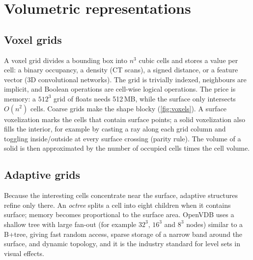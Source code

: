 

\section{Volumetric representations}

\subsection{Voxel grids}

A voxel grid divides a bounding box into $n^3$ cubic cells and stores a value per cell: a binary
occupancy, a density (CT scans), a signed distance, or a feature vector (3D convolutional
networks). The grid is trivially indexed, neighbours are implicit, and Boolean operations are
cell-wise logical operations. The price is memory: a $512^3$ grid of floats needs 512\,MB, while
the surface only intersects $O(n^2)$ cells. Coarse grids make the shape blocky
(\cref{fig:voxels}). A surface voxelization marks the cells that contain surface points; a solid
voxelization also fills the interior, for example by casting a ray along each grid column and
toggling inside/outside at every surface crossing (parity rule). The volume of a solid is then
approximated by the number of occupied cells times the cell volume.


\subsection{Adaptive grids}

Because the interesting cells concentrate near the surface, adaptive structures refine only
there. An \emph{octree} splits a cell into eight children when it contains surface; memory becomes
proportional to the surface area. OpenVDB \citep{Museth2013} uses a shallow tree with large
fan-out (for example $32^3$, $16^3$ and $8^3$ nodes) similar to a B+tree, giving fast random
access, sparse storage of a narrow band around the surface, and dynamic topology, and it is the
industry standard for level sets in visual effects.

